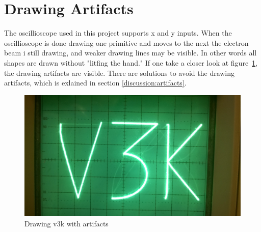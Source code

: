 \section{Drawing Artifacts}
\label{results:artifacts}
The oscillioscope used in this project supports x and y inputs.
When the oscillioscope is done drawing one primitive and moves to the next the electron beam i still drawing,
and weaker drawing lines may be visible.
In other words all shapes are drawn without "litfing the hand."
If one take a closer look at figure~\ref{fig:artifact}, the drawing artifacts are visible.
There are solutions to avoid the drawing artifacts, which is exlained in section \ref{discussion:artifacts}.


\begin{figure}[h]
	    \includegraphics[width=\linewidth]{images/artifacts.jpg}
	    \caption{Drawing v3k with artifacts}
	    \label{fig:artifact}
\end{figure}
